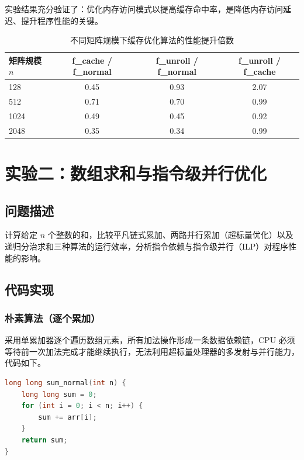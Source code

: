 \documentclass[a4paper]{article}
\begin{document}
实验结果充分验证了：优化内存访问模式以提高缓存命中率，是降低内存访问延迟、提升程序性能的关键。

\begin{table}[htbp]
  \centering
  \caption{不同矩阵规模下缓存优化算法的性能提升倍数}
  \label{tab:cache_speedup}
  \begin{tabular}{lccc}
    \toprule
    \textbf{矩阵规模} $n$ & \textbf{f\_cache / f\_normal} & \textbf{f\_unroll / f\_normal} & \textbf{f\_unroll / f\_cache} \\
    \midrule
    128 & 0.45 & 0.93 & 2.07 \\
    512 & 0.71 & 0.70 & 0.99 \\
    1024 & 0.49 & 0.45 & 0.92 \\
    2048 & 0.35 & 0.34 & 0.99 \\
    \bottomrule
  \end{tabular}
\end{table}

\section{实验二：数组求和与指令级并行优化}

\subsection{问题描述}

计算给定 $n$ 个整数的和，比较平凡链式累加、两路并行累加（超标量优化）以及递归分治求和三种算法的运行效率，分析指令依赖与指令级并行（ILP）对程序性能的影响。


\subsection{代码实现}

\subsubsection{朴素算法（逐个累加）}
采用单累加器逐个遍历数组元素，所有加法操作形成一条数据依赖链，CPU 必须等待前一次加法完成才能继续执行，无法利用超标量处理器的多发射与并行能力，代码如下。

\begin{lstlisting}[title=逐一遍历平凡求和算法,frame=trbl,language={C++}]
long long sum_normal(int n) {
    long long sum = 0;
    for (int i = 0; i < n; i++) {
        sum += arr[i];
    }
    return sum;
}
\end{lstlisting}
\end{document}
